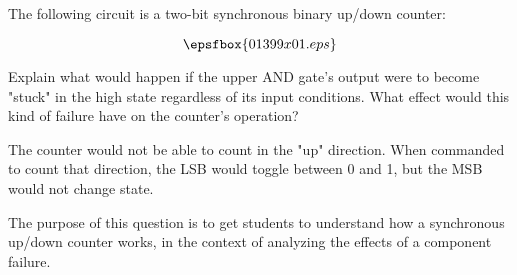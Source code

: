 

The following circuit is a two-bit synchronous binary up/down counter:

$$\epsfbox{01399x01.eps}$$

Explain what would happen if the upper AND gate's output were to become "stuck" in the high state regardless of its input conditions.  What effect would this kind of failure have on the counter's operation?







The counter would not be able to count in the "up" direction.  When commanded to count that direction, the LSB would toggle between 0 and 1, but the MSB would not change state.







The purpose of this question is to get students to understand how a synchronous up/down counter works, in the context of analyzing the effects of a component failure.




